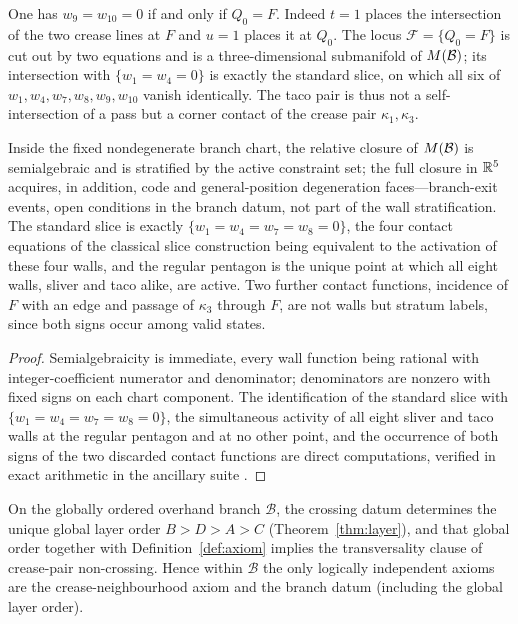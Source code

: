 \begin{observation}\label{obs:corner}
One has $w_9=w_{10}=0$ if and only if $Q_0=F$. Indeed $t=1$ places the intersection of the two crease lines at $F$ and $u=1$ places it at $Q_0$. The locus $\mathcal F=\{Q_0=F\}$ is cut out by two equations and is a three-dimensional submanifold of $M(\mathcal{B})$; its intersection with $\{w_1=w_4=0\}$ is exactly the standard slice, on which all six of $w_1,w_4,w_7,w_8,w_9,w_{10}$ vanish identically. The taco pair is thus not a self-intersection of a pass but a corner contact of the crease pair $\kappa_1,\kappa_3$.
\end{observation}

\begin{proposition}[Stratification]\label{prop:strat}
Inside the fixed nondegenerate branch chart, the relative closure of $M(\mathcal{B})$ is semialgebraic and is stratified by the active constraint set; the full closure in $\mathbb{R}^5$ acquires, in addition, code and general-position degeneration faces---branch-exit events, open conditions in the branch datum, not part of the wall stratification. The standard slice is exactly $\{w_1=w_4=w_7=w_8=0\}$, the four contact equations of the classical slice construction being equivalent to the activation of these four walls, and the regular pentagon is the unique point at which all eight walls, sliver and taco alike, are active. Two further contact functions, incidence of $F$ with an edge and passage of $\kappa_3$ through $F$, are not walls but stratum labels, since both signs occur among valid states.
\end{proposition}

\begin{proof}
Semialgebraicity is immediate, every wall function being rational with integer-coefficient numerator and denominator; denominators are nonzero with fixed signs on each chart component. The identification of the standard slice with $\{w_1=w_4=w_7=w_8=0\}$, the simultaneous activity of all eight sliver and taco walls at the regular pentagon and at no other point, and the occurrence of both signs of the two discarded contact functions are direct computations, verified in exact arithmetic in the ancillary suite \cite{anc}.
\end{proof}

\begin{proposition}\label{prop:axred}
On the globally ordered overhand branch $\mathcal B$, the crossing datum determines the unique global layer order $B>D>A>C$ \textup{(Theorem~\ref{thm:layer})}, and that global order together with Definition~\textup{\ref{def:axiom}} implies the transversality clause of crease-pair non-crossing. Hence within $\mathcal B$ the only logically independent axioms are the crease-neighbourhood axiom and the branch datum (including the global layer order).
\end{proposition}

